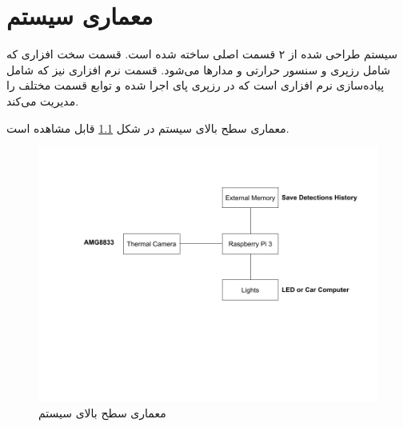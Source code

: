 \chapter{معماری سیستم}

سیستم طراحی شده از ۲ قسمت اصلی ساخته شده است. قسمت سخت افزاری که شامل رزپری و سنسور حرارتی و مدار‌ها می‌شود. قسمت نرم افزاری نیز که شامل پیاده‌سازی نرم‌ افزاری‌ است که در رزپری پای اجرا شده و توابع قسمت مختلف را مدیریت می‌کند.

معماری سطح بالای سیستم در شکل \ref{fig:1} قابل مشاهده است.

\begin{figure}[ht!]
\centering
		\includegraphics[scale=0.5]{figs/arch.png}

	\caption{معماری سطح بالای سیستم}
	\label{fig:1}
\end{figure}